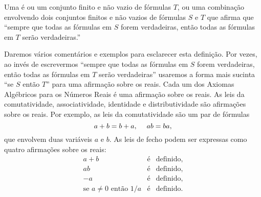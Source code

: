 \documentclass{svmono}
\begin{document}
\begin{defin}
Uma  é ou um conjunto finito e não vazio
de fórmulas $T$, ou uma combinação envolvendo dois conjuntos finitos e
não vazios de fórmulas $S$ e $T$ que afirma que ``sempre que todas as
fórmulas em $S$ forem verdadeiras, então todas as fórmulas em $T$ serão
verdadeiras.''
\end{defin}

Daremos vários comentários e exemplos para esclarecer esta definição. Por
vezes, ao invés de escrevermos ``sempre que todas as
fórmulas em $S$ forem verdadeiras, então todas as fórmulas em $T$ serão
verdadeiras'' usaremos a forma mais sucinta ``se $S$ então $T$'' para
uma afirmação sobre os reais. Cada um dos Axiomas Algébricos para os Números
Reais é uma afirmação sobre os reais. As leis da comutatividade,
associatividade, identidade e distributividade são afirmações sobre os
reais. Por exemplo, as leis da comutatividade são um par de fórmulas
\[
a  + b = b + a, \hspace{3ex} ab = ba,
\]
que envolvem duas variáveis $a$ e $b$. As leis de fecho podem ser expressas
como quatro afirmações sobre os reais:
\begin{eqnarray*}
a + b & \text{é} & \text{definido}, \\
ab    & \text{é} & \text{definido}, \\
-a    & \text{é} & \text{definido}, \\
\text{se } a \ne 0 \text{ então } 1/a & \text{é} & \text{definido}.
\end{eqnarray*}

\backmatter

\printindex
\end{document}

